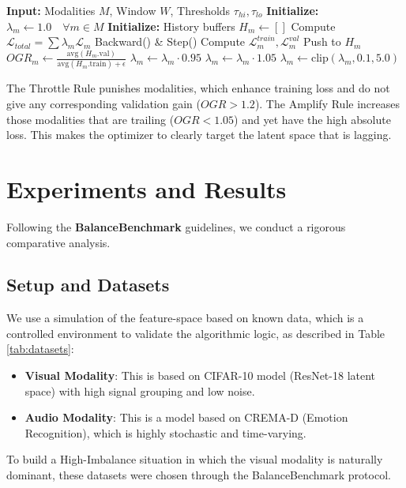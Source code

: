 \documentclass[10pt, twocolumn, letterpaper]{article}
\begin{document}
\begin{algorithm}[h]
\caption{Modality Fairness Controller (MFC)}
\begin{algorithmic}[1]
\STATE \textbf{Input:} Modalities $M$, Window $W$, Thresholds $\tau_{hi}, \tau_{lo}$
\STATE \textbf{Initialize:} $\lambda_m \leftarrow 1.0 \quad \forall m \in M$
\STATE \textbf{Initialize:} History buffers $H_m \leftarrow []$
        \STATE Compute $\mathcal{L}_{total} = \sum \lambda_m \mathcal{L}_m$
        \STATE Backward() \& Step()
    \ENDFOR
        \STATE Compute $\mathcal{L}^{train}_m, \mathcal{L}^{val}_m$
        \STATE Push to $H_m$
            \STATE $OGR_m \leftarrow \frac{\text{avg}(H_m.\text{val})}{\text{avg}(H_m.\text{train}) + \epsilon}$
                \STATE $\lambda_m \leftarrow \lambda_m \cdot 0.95$ 
                \STATE $\lambda_m \leftarrow \lambda_m \cdot 1.05$ 
            \ENDIF
            \STATE $\lambda_m \leftarrow \text{clip}(\lambda_m, 0.1, 5.0)$
        \ENDIF
    \ENDFOR
\ENDFOR
\end{algorithmic}
\label{alg:mfc}
\end{algorithm}

The Throttle Rule punishes modalities, which enhance training loss and do not give any corresponding validation gain ($OGR > 1.2$). The Amplify Rule increases those modalities that are trailing ($OGR < 1.05$) and yet have the high absolute loss. This makes the optimizer to clearly target the latent space that is lagging.

\section{Experiments and Results}

Following the \textbf{BalanceBenchmark} guidelines, we conduct a rigorous comparative analysis.

\subsection{Setup and Datasets}
We use a simulation of the feature-space based on known data, which is a controlled environment to validate the algorithmic logic, as described in Table \ref{tab:datasets}:
\begin{itemize}
    \item \textbf{Visual Modality}: This is based on CIFAR-10 \cite{krizhevsky2009learning} model (ResNet-18 latent space) with high signal grouping and low noise.
    \item \textbf{Audio Modality}: This is a model based on CREMA-D \cite{cao2014crema} (Emotion Recognition), which is highly stochastic and time-varying.
\end{itemize}
To build a High-Imbalance situation in which the visual modality is naturally dominant, these datasets were chosen through the BalanceBenchmark \cite{xu2025balancebenchmark} protocol.
\end{document}
